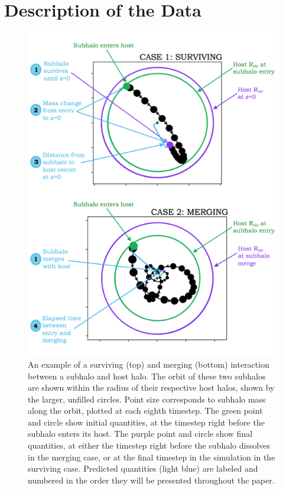 \documentclass[fleqn,usenatbib]{mnras}
\begin{document}
\section{Description of the Data}
\label{sec:simulation}
\begin{figure}
	\includegraphics[width=\columnwidth]{Figures/explanatory_figures}
	\vspace{-15pt}
    \caption{An example of a surviving (top) and merging (bottom) interaction between a subhalo and host halo. The orbit of these two subhalos are shown within the radius of their respective host halos, shown by the larger, unfilled circles. Point size corresponds to subhalo mass along the orbit, plotted at each eighth timestep. The green point and circle show initial quantities, at the timestep right before the subhalo enters its host. The purple point and circle show final quantities, at either the timestep right before the subhalo dissolves in the merging case, or at the final timestep in the simulation in the surviving case. Predicted quantities (light blue) are labeled and numbered in the order they will be presented throughout the paper.}
    \label{fig:explanatory_figures}
\end{figure}
\end{document}
